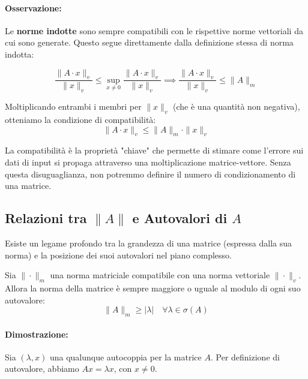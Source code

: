 \documentclass[a4paper,12pt]{article}
\begin{document}
	\paragraph{Osservazione:}
	Le \textbf{norme indotte} sono sempre compatibili con le rispettive norme vettoriali da cui sono generate. Questo segue direttamente dalla definizione stessa di norma indotta:
	
	\[
	\frac{\|A \cdot x\|_v}{\|x\|_v} \le \sup_{x \neq 0} \frac{\|A \cdot x\|_v}{\|x\|_v} \implies \frac{\|A \cdot x\|_v}{\|x\|_v} \le \|A\|_m
	\]
	
	Moltiplicando entrambi i membri per $\|x\|_v$ (che è una quantità non negativa), otteniamo la condizione di compatibilità:
	\begin{equation}
		\|A \cdot x\|_v \le \|A\|_m \cdot \|x\|_v
	\end{equation}
	
	\begin{tcolorbox}[title=Nota bene, colback=yellow!5!white]
		La compatibilità è la proprietà "chiave" che permette di stimare come l'errore sui dati di input si propaga attraverso una moltiplicazione matrice-vettore. Senza questa disuguaglianza, non potremmo definire il numero di condizionamento di una matrice.
	\end{tcolorbox}
	
	\subsection{Relazioni tra $\|A\|$ e Autovalori di $A$}
	
	Esiste un legame profondo tra la grandezza di una matrice (espressa dalla sua norma) e la posizione dei suoi autovalori nel piano complesso.
	
	\begin{tcolorbox}[title=Teorema: Maggiorazione degli Autovalori, colback=red!5!white, colframe=red!75!black]
		Sia $\|\cdot\|_m$ una norma matriciale compatibile con una norma vettoriale $\|\cdot\|_v$. Allora la norma della matrice è sempre maggiore o uguale al modulo di ogni suo autovalore:
		\begin{equation}
			\|A\|_m \ge |\lambda| \quad \forall \lambda \in \sigma(A)
		\end{equation}
	\end{tcolorbox}
	
	\paragraph{Dimostrazione:}
	Sia $(\lambda, x)$ una qualunque autocoppia per la matrice $A$. Per definizione di autovalore, abbiamo $Ax = \lambda x$, con $x \neq 0$. 
	
\end{document}
